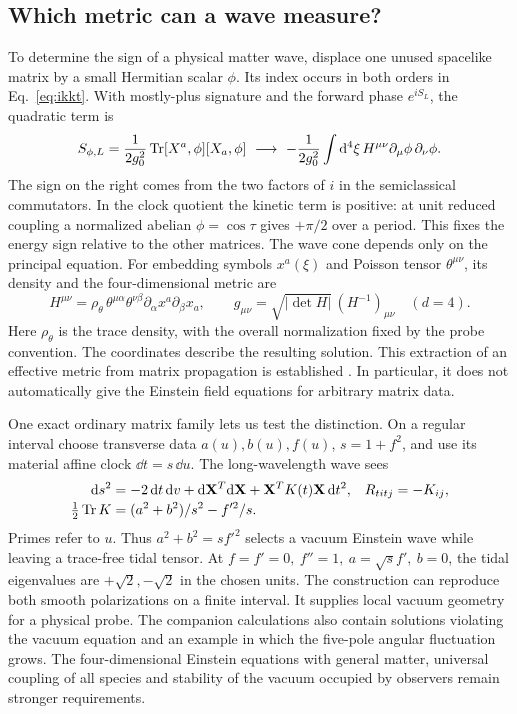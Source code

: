 \subsection{Which metric can a wave measure?}
To determine the sign of a physical matter wave, displace one unused spacelike matrix by a small Hermitian scalar \(\phi\). Its index occurs in both orders in Eq.~\eqref{eq:ikkt}. With mostly-plus signature and the forward phase \(e^{iS_L}\), the quadratic term is
\[
 S_{\phi,L}=\frac{1}{2g_0^2}\operatorname{Tr}[X^a,\phi][X_a,\phi]
 \ \longrightarrow\
 -\frac{1}{2g_0^2}\int \mathrm d^4\xi\,H^{\mu\nu}\partial_\mu\phi\,\partial_\nu\phi .
\]
The sign on the right comes from the two factors of \(i\) in the semiclassical commutators. In the clock quotient the kinetic term is positive: at unit reduced coupling a normalized abelian \(\phi=\cos\tau\) gives \(+\pi/2\) over a period. This fixes the energy sign relative to the other matrices. The wave cone depends only on the principal equation. For embedding symbols \(x^a(\xi)\) and Poisson tensor \(\theta^{\mu\nu}\), its density and the four-dimensional metric are
\[
 H^{\mu\nu}=\rho_\theta\,\theta^{\mu\alpha}\theta^{\nu\beta}
       \partial_\alpha x^a\partial_\beta x_a,\qquad
 g_{\mu\nu}=\sqrt{|\det H|}\,(H^{-1})_{\mu\nu}\quad(d=4).
\]
Here \(\rho_\theta\) is the trace density, with the overall normalization fixed by the probe convention. The coordinates describe the resulting solution. This extraction of an effective metric from matrix propagation is established \cite{steinacker,kim}. In particular, it does not automatically give the Einstein field equations for arbitrary matrix data.

One exact ordinary matrix family lets us test the distinction. On a regular interval choose transverse data \(a(u),b(u),f(u)\), \(s=1+f^2\), and use its material affine clock \(\dd t=s\,\dd u\). The long-wavelength wave sees
\begin{align}
 \mathrm d s^2&=-2\,\mathrm d t\,\mathrm d v+\mathrm d{\bf X}^T\mathrm d{\bf X}
              +{\bf X}^T K(t){\bf X}\,\mathrm d t^2 ,&
 R_{titj}&=-K_{ij},\nonumber\\[-2pt]
 \tfrac12\operatorname{Tr} K&=(a^2+b^2)/s^2-f'^2/s . \label{eq:wave}
\end{align}
Primes refer to \(u\). Thus \(a^2+b^2=sf'^2\) selects a vacuum Einstein wave while leaving a trace-free tidal tensor. At \(f=f'=0,\ f''=1,\ a=\sqrt{s}f',\ b=0\), the tidal eigenvalues are \(+\sqrt2,-\sqrt2\) in the chosen units. The construction can reproduce both smooth polarizations on a finite interval. It supplies local vacuum geometry for a physical probe. The companion calculations also contain solutions violating the vacuum equation and an example in which the five-pole angular fluctuation grows. The four-dimensional Einstein equations with general matter, universal coupling of all species and stability of the vacuum occupied by observers remain stronger requirements.

